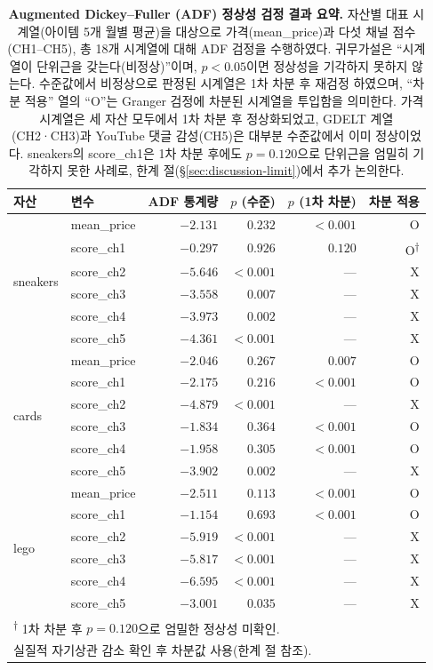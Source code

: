 \documentclass[11pt, a4paper, twocolumn]{article}
\begin{document}
\begin{table}[!tbp]
\centering\small
\caption[ADF 정상성 검정 결과]{\textbf{Augmented Dickey--Fuller
(ADF) 정상성 검정 결과 요약.} 자산별 대표 시계열(아이템 5개 월별
평균)을 대상으로 가격(\textsf{mean\_price})과 다섯 채널 점수(CH1--CH5),
총 18개 시계열에 대해 ADF 검정을 수행하였다. 귀무가설은 ``시계열이
단위근을 갖는다(비정상)''이며, $p<0.05$이면 정상성을 기각하지 못하지
않는다. 수준값에서 비정상으로 판정된 시계열은 1차 차분 후 재검정
하였으며, ``차분 적용'' 열의 ``O''는 Granger 검정에 차분된 시계열을
투입함을 의미한다. 가격 시계열은 세 자산 모두에서 1차 차분 후
정상화되었고, GDELT 계열(CH2·CH3)과 YouTube 댓글 감성(CH5)은 대부분
수준값에서 이미 정상이었다. sneakers의 \textsf{score\_ch1}은 1차
차분 후에도 $p=0.120$으로 단위근을 엄밀히 기각하지 못한 사례로,
한계 절(\S\ref{sec:discussion-limit})에서 추가 논의한다.}
\label{tab:stationarity}
\begin{tabular}{llrrrr}
\toprule
자산 & 변수 & ADF 통계량 & $p$ (수준) & $p$ (1차 차분) & 차분 적용 \\
\midrule
\multirow{6}{*}{sneakers}
 & mean\_price & $-2.131$ & $0.232$ & $<0.001$ & O \\
 & score\_ch1  & $-0.297$ & $0.926$ & $0.120$  & O\textsuperscript{†} \\
 & score\_ch2  & $-5.646$ & $<0.001$ & ---     & X \\
 & score\_ch3  & $-3.558$ & $0.007$  & ---     & X \\
 & score\_ch4  & $-3.973$ & $0.002$  & ---     & X \\
 & score\_ch5  & $-4.361$ & $<0.001$ & ---     & X \\
\midrule
\multirow{6}{*}{cards}
 & mean\_price & $-2.046$ & $0.267$ & $0.007$ & O \\
 & score\_ch1  & $-2.175$ & $0.216$ & $<0.001$ & O \\
 & score\_ch2  & $-4.879$ & $<0.001$ & ---    & X \\
 & score\_ch3  & $-1.834$ & $0.364$ & $<0.001$ & O \\
 & score\_ch4  & $-1.958$ & $0.305$ & $<0.001$ & O \\
 & score\_ch5  & $-3.902$ & $0.002$  & ---    & X \\
\midrule
\multirow{6}{*}{lego}
 & mean\_price & $-2.511$ & $0.113$ & $<0.001$ & O \\
 & score\_ch1  & $-1.154$ & $0.693$ & $<0.001$ & O \\
 & score\_ch2  & $-5.919$ & $<0.001$ & ---    & X \\
 & score\_ch3  & $-5.817$ & $<0.001$ & ---    & X \\
 & score\_ch4  & $-6.595$ & $<0.001$ & ---    & X \\
 & score\_ch5  & $-3.001$ & $0.035$  & ---    & X \\
\bottomrule
\multicolumn{6}{l}{\textsuperscript{†} 1차 차분 후 $p=0.120$으로 엄밀한 정상성 미확인.}\\
\multicolumn{6}{l}{\quad 실질적 자기상관 감소 확인 후 차분값 사용(한계 절 참조).}
\end{tabular}
\end{table}
\end{document}
